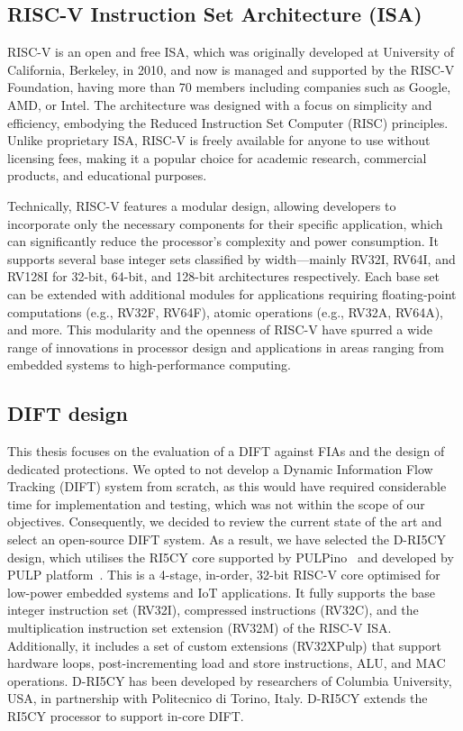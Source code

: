 \subsection{RISC-V Instruction Set Architecture (ISA)}
RISC-V is an open and free ISA, which was originally developed at University of California, Berkeley, in 2010, and now is managed and supported by the RISC-V Foundation, having more than 70 members including companies such as Google, AMD, or Intel. The architecture was designed with a focus on simplicity and efficiency, embodying the Reduced Instruction Set Computer (RISC) principles. Unlike proprietary ISA, RISC-V is freely available for anyone to use without licensing fees, making it a popular choice for academic research, commercial products, and educational purposes.

Technically, RISC-V features a modular design, allowing developers to incorporate only the necessary components for their specific application, which can significantly reduce the processor's complexity and power consumption. It supports several base integer sets classified by width—mainly RV32I, RV64I, and RV128I for 32-bit, 64-bit, and 128-bit architectures respectively. Each base set can be extended with additional modules for applications requiring floating-point computations (e.g., RV32F, RV64F), atomic operations (e.g., RV32A, RV64A), and more. This modularity and the openness of RISC-V have spurred a wide range of innovations in processor design and applications in areas ranging from embedded systems to high-performance computing.

\subsection{DIFT design}
This thesis focuses on the evaluation of a DIFT against FIAs and the design of dedicated protections. We opted to not develop a Dynamic Information Flow Tracking (DIFT) system from scratch, as this would have required considerable time for implementation and testing, which was not within the scope of our objectives. Consequently, we decided to review the current state of the art and select an open-source DIFT system.
As a result, we have selected the D-RI5CY~\cite{PDGLC-18-hpec, driscy} design, which utilises the RI5CY core supported by PULPino~\cite{pulpino} and developed by PULP platform~\cite{pulp}. This is a 4-stage, in-order, 32-bit RISC-V core optimised for low-power embedded systems and IoT applications. It fully supports the base integer instruction set (RV32I), compressed instructions (RV32C), and the multiplication instruction set extension (RV32M) of the RISC-V ISA. Additionally, it includes a set of custom extensions (RV32XPulp) that support hardware loops, post-incrementing load and store instructions, ALU, and MAC operations.
D-RI5CY has been developed by researchers of Columbia University, USA, in partnership with Politecnico di Torino, Italy. D-RI5CY extends the RI5CY processor to support in-core DIFT.


